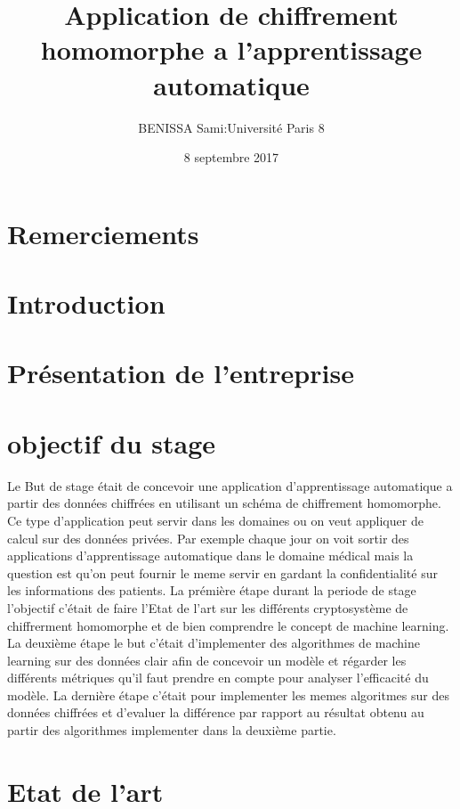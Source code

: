 \documentclass[a4paper,12pt]{report}
\title{Application de chiffrement homomorphe a l'apprentissage automatique}
\author{BENISSA Sami\quad:\quad Université Paris 8}
\date{8 septembre 2017}
\begin{document}
\maketitle
\section{Remerciements}
\newpage
\section{Introduction}
\newpage
\section{Présentation de l’entreprise}
\newpage
\newpage

\section{objectif du stage}
Le But de  stage était de concevoir une application d'apprentissage automatique a partir des données chiffrées en utilisant un schéma de chiffrement homomorphe.\newline
Ce type d'application peut servir dans les domaines ou on veut appliquer de calcul sur des données privées.\newline
Par exemple chaque jour on voit sortir des applications d'apprentissage automatique dans le domaine médical mais la question est qu'on peut fournir le meme servir en gardant la confidentialité sur les informations des patients.\newline
La prémière étape durant la periode de stage l'objectif c'était de faire l'Etat de l'art sur les différents cryptosystème de chiffrerment homomorphe et de bien comprendre le concept de machine learning.\newline
La deuxième étape le but c'était d'implementer des algorithmes de machine learning sur des données clair afin de concevoir un modèle et régarder les différents métriques qu'il faut prendre en compte pour analyser l'efficacité du modèle.\newline
La dernière étape c'était pour implementer les memes algoritmes sur des données chiffrées et d'evaluer la différence par rapport au résultat obtenu au partir des algorithmes implementer dans la deuxième partie.\newline
\section{Etat de l'art} 
\end{document}

